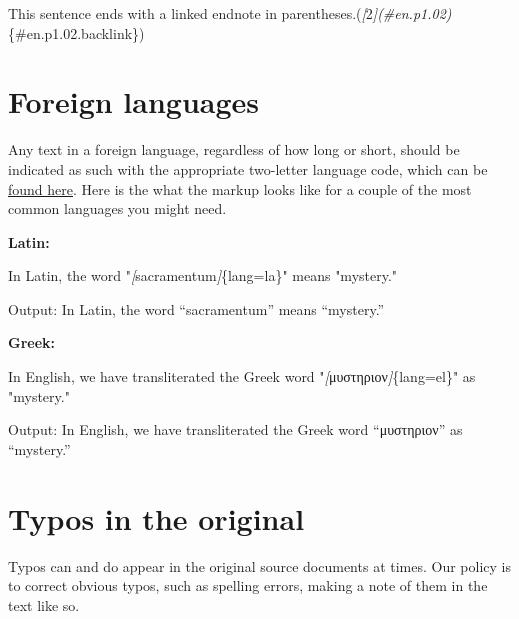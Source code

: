 \documentclass[
  english,
]{book}
\newenvironment{Shaded}{\begin{snugshade}}{\end{snugshade}}
\newcommand{\CommentTok}[1]{\textcolor[rgb]{0.56,0.35,0.01}{\textit{#1}}}
\newcommand{\NormalTok}[1]{#1}
\newcommand{\OtherTok}[1]{\textcolor[rgb]{0.56,0.35,0.01}{#1}}
\providecommand{\textlatin}{}
\renewcommand{\textlatin}[2][]{\foreignlanguage{latin}{#2}}
\newcommand{\textgreek}[2][]{\foreignlanguage{greek}{#2}}
\begin{document}
\begin{Shaded}
\begin{Highlighting}[]
\NormalTok{This sentence ends with a linked endnote in parentheses.(}\CommentTok{[}\OtherTok{2}\CommentTok{](\#en.p1.02)}\NormalTok{\{\#en.p1.02.backlink\})}
\end{Highlighting}
\end{Shaded}

\hypertarget{foreign-languages}{%
\chapter{Foreign languages}\label{foreign-languages}}

Any text in a foreign language, regardless of how long or short, should be indicated as such with the appropriate two-letter language code, which can be \href{https://www.w3schools.com/tags/ref_language_codes.asp}{found here}. Here is the what the markup looks like for a couple of the most common languages you might need.

\textbf{Latin:}

\begin{Shaded}
\begin{Highlighting}[]
\NormalTok{In Latin, the word "}\CommentTok{[}\OtherTok{sacramentum}\CommentTok{]}\NormalTok{\{lang=la\}" means "mystery."}
\end{Highlighting}
\end{Shaded}

Output: In Latin, the word ``\textlatin{sacramentum}'' means ``mystery.''

\textbf{Greek:}

\begin{Shaded}
\begin{Highlighting}[]
\NormalTok{In English, we have transliterated the Greek word "}\CommentTok{[}\OtherTok{μυστηριον}\CommentTok{]}\NormalTok{\{lang=el\}" as "mystery."}
\end{Highlighting}
\end{Shaded}

Output: In English, we have transliterated the Greek word ``\textgreek{μυστηριον}'' as ``mystery.''

\hypertarget{typos-in-the-original}{%
\chapter{Typos in the original}\label{typos-in-the-original}}

Typos can and do appear in the original source documents at times. Our policy is to correct obvious typos, such as spelling errors, making a note of them in the text like so.
\end{document}
